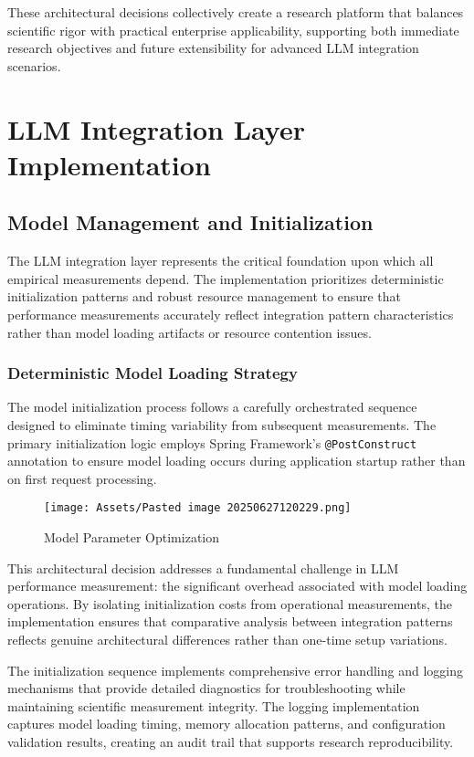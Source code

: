 These architectural decisions collectively create a research platform that balances scientific rigor with practical enterprise applicability, supporting both immediate research objectives and future extensibility for advanced LLM integration scenarios.



\chapter{LLM Integration Layer Implementation}

\section{Model Management and Initialization}

The LLM integration layer represents the critical foundation upon which all empirical measurements depend. The implementation prioritizes deterministic initialization patterns and robust resource management to ensure that performance measurements accurately reflect integration pattern characteristics rather than model loading artifacts or resource contention issues.

\subsection{Deterministic Model Loading Strategy}

The model initialization process follows a carefully orchestrated sequence designed to eliminate timing variability from subsequent measurements. The primary initialization logic employs Spring Framework's \texttt{@PostConstruct} annotation to ensure model loading occurs during application startup rather than on first request processing.

\begin{figure}[H]
    \centering
    \texttt{[image: Assets/Pasted image 20250627120229.png]}
    \caption{Model Parameter Optimization}
\end{figure}
This architectural decision addresses a fundamental challenge in LLM performance measurement: the significant overhead associated with model loading operations. By isolating initialization costs from operational measurements, the implementation ensures that comparative analysis between integration patterns reflects genuine architectural differences rather than one-time setup variations.

The initialization sequence implements comprehensive error handling and logging mechanisms that provide detailed diagnostics for troubleshooting while maintaining scientific measurement integrity. The logging implementation captures model loading timing, memory allocation patterns, and configuration validation results, creating an audit trail that supports research reproducibility.

